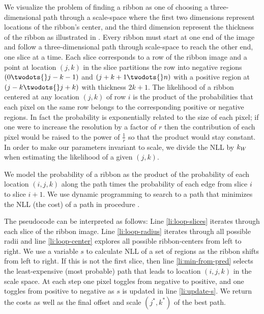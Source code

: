 
We visualize the problem of finding a ribbon as one of choosing a three-dimensional path through a
scale-space where the first two dimensions represent locations of the ribbon's center, and the third
dimension represent the thickness of the ribbon as illustrated in . Every
ribbon must start at one end of the image and follow a three-dimensional path through scale-space to
reach the other end, one slice at a time. Each slice corresponds to a row of the ribbon image and a
point at location $(j, k)$ in the slice partitions the row into negative regions
$(0\twodots{}j-k-1)$ and $(j+k+1\twodots{}n)$ with a positive region at $(j-k \twodots{} j+k)$ with
thickness $2k+1$. The likelihood of a ribbon centered at any location $(j, k)$ of row $i$ is the product of the probabilities that
each pixel on the same row belongs to the corresponding positive or negative regions.  In fact the
probability is exponentially related to the size of each pixel; if one were to increase the
resolution by a factor of $r$ then the contribution of each pixel would be raised to the power of
$\frac{1}{r}$ so that the product would stay constant. In order to make our parameters invariant to
scale, we divide the \ac{NLL} by $k_W{}$ when estimating the likelihood of a given $(j,k)$.

We model the probability of a ribbon as the product of the probability of each location $(i, j, k)$
along the path times the probability of each edge from slice $i$ to slice $i+1$. We use dynamic
programming to search to a path that minimizes the \ac{NLL} (the cost) of a path in procedure
.

The pseudocode can be interpreted as follows: Line \ref{li:loop-slices} iterates through each slice
of the ribbon image. Line \ref{li:loop-radius} iterates through all possible radii and line
\ref{li:loop-center} explores all possible ribbon-centers from left to right. We use a variable $s$
to calculate \ac{NLL} of a set of regions as the ribbon shifts from left to right. If this is not
the first slice, then line \ref{li:min-from-pred} selects the least-expensive (most probable) path
that leads to location $(i, j, k)$ in the scale space.  At each step one pixel toggles from negative
to positive, and one toggles from positive to negative as $s$ is updated in line \ref{li:update-s}. 
We return the costs as well as the final offset and scale $(j^*, k^*)$ of the best path.


